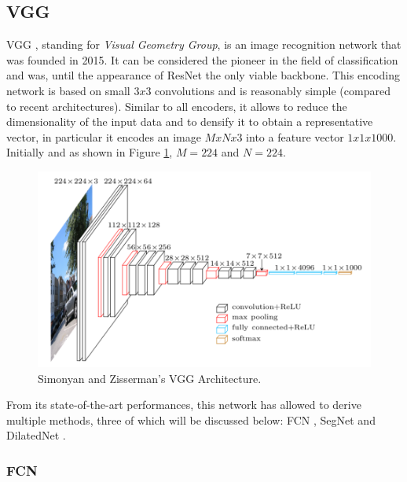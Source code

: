 \subsection{VGG}\label{seg2}

VGG \cite{simonyan2014very}, standing for \emph{Visual Geometry Group}, is an image recognition network that was founded in 2015. It can be considered the pioneer in the field of classification and was, until the appearance of ResNet the only viable backbone.
This encoding network is based on small $3x3$ convolutions and is reasonably simple (compared to recent architectures). Similar to all encoders, it allows to reduce the dimensionality of the input data and to densify it to obtain a representative vector, in particular it encodes an image $MxNx3$ into a feature vector $1x1x1000$. Initially and as shown in Figure \ref{fig:vgg}, $M = 224$ and $N = 224$.

\begin{figure}[h]
	\centering
	\includegraphics[width=0.5\linewidth]{Figures/SOA/VGG}
	\caption[Simonyan and Zisserman's VGG Architecture.]{Simonyan and Zisserman's \cite{simonyan2014very} VGG Architecture.}
	\label{fig:vgg}
\end{figure}


From its state-of-the-art performances, this network has allowed to derive multiple methods, three of which will be discussed below: FCN \cite{long2015fully}, SegNet \cite{DBLP:journals/corr/BadrinarayananH15} and DilatedNet \cite{yu2015multi}.

\subsubsection{FCN}

